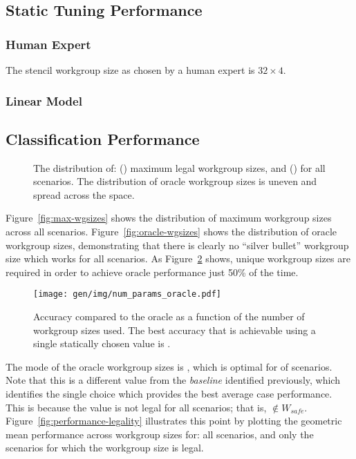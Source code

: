\subsection{Static Tuning Performance}


\subsubsection{Human Expert}


The stencil workgroup size as chosen by a human expert is
$32 \times 4$.


\subsubsection{Linear Model}


\subsection{Classification Performance}


\begin{figure}

\caption{%
  The distribution of: () maximum legal
  workgroup sizes, and () for all
  scenarios. The distribution of oracle workgroup sizes is uneven and
  spread across the space.%
}
\label{fig:heatmaps}
\end{figure}

Figure~\ref{fig:max-wgsizes} shows the distribution of maximum
workgroup sizes across all scenarios. Figure~\ref{fig:oracle-wgsizes}
shows the distribution of oracle workgroup sizes, demonstrating that
there is clearly no ``silver bullet'' workgroup size which works for
all scenarios. As Figure~\ref{fig:oracle-accuracy} shows,
 unique workgroup sizes are
required in order to achieve oracle performance just 50\% of the
time. 

\begin{figure}
\centering
\texttt{[image: gen/img/num\_params\_oracle.pdf]}
\caption{%
  Accuracy compared to the oracle as a function of the number of
  workgroup sizes used. The best accuracy that is achievable using a
  single statically chosen value is
  \protect.%
}
\label{fig:oracle-accuracy}
\end{figure}

The mode of the oracle workgroup sizes is
, which is optimal for
 of scenarios. Note that this is
a different value from the \emph{baseline} identified previously,
which identifies the single choice which provides the best average
case performance. This is because the value is not legal for all
scenarios; that is, $ \not\in W_{safe}$.
Figure~\ref{fig:performance-legality} illustrates this point by
plotting the geometric mean performance across workgroup sizes for:
all scenarios, and only the scenarios for which the workgroup size is
legal.

